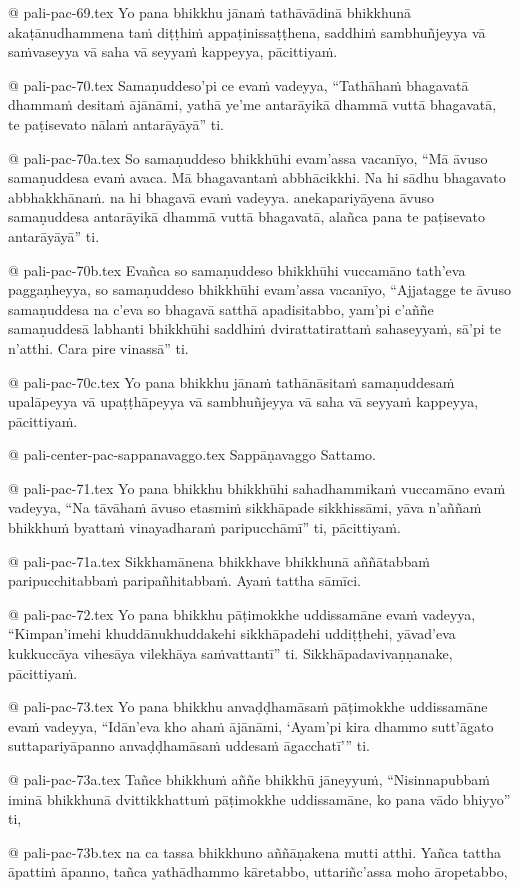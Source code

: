 @ pali-pac-69.tex
Yo pana bhikkhu jānaṁ tathāvādinā bhikkhunā akaṭānudhammena taṁ diṭṭhiṁ appaṭinissaṭṭhena, saddhiṁ sambhuñjeyya vā saṁvaseyya vā saha vā seyyaṁ kappeyya, pācittiyaṁ.

@ pali-pac-70.tex
Samaṇuddeso’pi ce evaṁ vadeyya, “Tathāhaṁ bhagavatā dhammaṁ desitaṁ ājānāmi, yathā ye’me antarāyikā dhammā vuttā bhagavatā, te paṭisevato nālaṁ antarāyāyā” ti.

@ pali-pac-70a.tex
 So samaṇuddeso bhikkhūhi evam’assa vacanīyo, “Mā āvuso samaṇuddesa evaṁ avaca. Mā bhagavantaṁ abbhācikkhi. Na hi sādhu bhagavato abbhakkhānaṁ. na hi bhagavā evaṁ vadeyya. anekapariyāyena āvuso samaṇuddesa antarāyikā dhammā vuttā bhagavatā, alañca pana te paṭisevato antarāyāyā” ti. 

@ pali-pac-70b.tex
Evañca so samaṇuddeso bhikkhūhi vuccamāno tath’eva paggaṇheyya, so samaṇuddeso bhikkhūhi evam’assa vacanīyo, “Ajjatagge te āvuso samaṇuddesa na c’eva so bhagavā satthā apadisitabbo, yam’pi c’aññe samaṇuddesā labhanti bhikkhūhi saddhiṁ dvirattatirattaṁ sahaseyyaṁ, sā’pi te n’atthi. Cara pire vinassā” ti.

@ pali-pac-70c.tex
Yo pana bhikkhu jānaṁ tathānāsitaṁ samaṇuddesaṁ upalāpeyya vā upaṭṭhāpeyya vā sambhuñjeyya vā saha vā seyyaṁ kappeyya, pācittiyaṁ.

@ pali-center-pac-sappanavaggo.tex
Sappāṇavaggo Sattamo.

@ pali-pac-71.tex
Yo pana bhikkhu bhikkhūhi sahadhammikaṁ vuccamāno evaṁ vadeyya, “Na tāvāhaṁ āvuso etasmiṁ sikkhāpade sikkhissāmi, yāva n’aññaṁ bhikkhuṁ byattaṁ vinayadharaṁ paripucchāmī” ti, pācittiyaṁ.

@ pali-pac-71a.tex
Sikkhamānena bhikkhave bhikkhunā aññātabbaṁ paripucchitabbaṁ paripañhitabbaṁ. Ayaṁ tattha sāmīci.

@ pali-pac-72.tex
Yo pana bhikkhu pāṭimokkhe uddissamāne evaṁ vadeyya, “Kimpan’imehi khuddānukhuddakehi sikkhāpadehi uddiṭṭhehi, yāvad’eva kukkuccāya vihesāya vilekhāya saṁvattantī” ti. Sikkhāpadavivaṇṇanake, pācittiyaṁ.

@ pali-pac-73.tex
Yo pana bhikkhu anvaḍḍhamāsaṁ pāṭimokkhe uddissamāne evaṁ vadeyya, “Idān’eva kho ahaṁ ājānāmi, ‘Ayam’pi kira dhammo sutt’āgato suttapariyāpanno anvaḍḍhamāsaṁ uddesaṁ āgacchatī’” ti.

@ pali-pac-73a.tex
Tañce bhikkhuṁ aññe bhikkhū jāneyyuṁ, “Nisinnapubbaṁ iminā bhikkhunā dvittikkhattuṁ pāṭimokkhe uddissamāne, ko pana vādo bhiyyo” ti,

@ pali-pac-73b.tex
na ca tassa bhikkhuno aññāṇakena mutti atthi. Yañca tattha āpattiṁ āpanno, tañca yathādhammo kāretabbo, uttariñc’assa moho āropetabbo,

